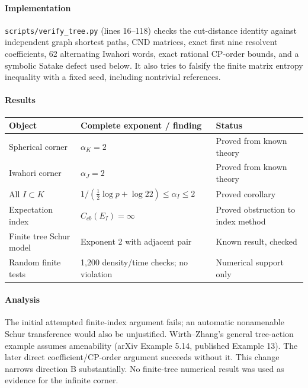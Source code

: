 \documentclass[11pt]{article}
\theoremstyle{remark}\newtheorem{remark}[definition]{Remark}
\begin{document}
\paragraph{Implementation} \texttt{scripts/verify\_tree.py} (lines 16--118) checks the
cut-distance identity against independent graph shortest paths, CND
matrices, exact first nine resolvent coefficients, 62 alternating
Iwahori words, exact rational CP-order bounds, and a symbolic Satake
defect used below. It also tries to falsify the finite matrix entropy
inequality with a fixed seed, including nontrivial references.
\paragraph{Results}
{\setlength{\tabcolsep}{8pt}\renewcommand{\arraystretch}{1.2}
\begin{tabular}{p{.22\linewidth}p{.45\linewidth}p{.20\linewidth}}\toprule
Object & Complete exponent / finding & Status\\\midrule
Spherical corner & $\alpha_K=2$ & Proved from known theory\\
Iwahori corner & $\alpha_J=2$ & Proved from known theory\\
All $I\subset K$ & $1/(\frac12\log p+\log22)\leq\alpha_I\leq2$ & Proved corollary\\
Expectation index & $C_{cb}(E_I)=\infty$ & Proved obstruction to index method\\
Finite tree Schur model & Exponent 2 with adjacent pair & Known result, checked\\
Random finite tests & 1,200 density/time checks; no violation & Numerical support only\\\bottomrule
\end{tabular}}
\paragraph{Analysis} The initial attempted finite-index argument fails;
an automatic nonamenable Schur transference would also be unjustified.
Wirth--Zhang's general tree-action example assumes amenability (arXiv
Example 5.14, published Example 13). The later direct coefficient/CP-order
argument succeeds without it. This change narrows direction B substantially.
No finite-tree numerical result was used as evidence for the infinite corner.
\end{document}
